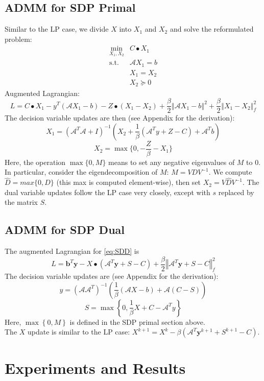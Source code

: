 \documentclass{article}
\begin{document}
\subsection*{ADMM for SDP Primal}
Similar to the LP case, we divide $X$ into $X_{1}$ and $X_{2}$
and solve the reformulated problem:
\begin{eqnarray*}
\min_{X_{1},X_{2}} & C\bullet X_{1}\\
\text{s.t.} & \mathcal{A}X_{1}=b\\
 & X_{1}=X_{2}\\
 & X_{2}\succeq0
\end{eqnarray*}
Augmented Lagrangian:
\[
L=C\bullet X_{1}-y^{T}\left(\mathcal{A}X_{1}-b\right)-Z\bullet\left(X_{1}-X_{2}\right)+\frac{\beta}{2}\left\Vert \mathcal{A}X_{1}-b\right\Vert ^{2}+\frac{\beta}{2}\left\Vert X_{1}-X_{2}\right\Vert _{f}^{2}
\]
The decision variable updates are then (see Appendix for the derivation):
\[
X_{1}=\left(\mathcal{A}^{T}\mathcal{A}+I\right)^{-1}\left(X_{2}+\frac{1}{\beta}\left(\mathcal{A}^{T}y+Z-C\right)+\mathcal{A}^{T}b\right)
\]
\[
X_{2} = \max\{0,-\frac{Z}{\beta}-X_{1}\}
\]
Here, the operation $\max\{0,M\}$ means to set any negative eigenvalues
of $M$ to 0. In particular, consider the eigendecomposition of $M$:
$M=VDV^{-1}$. We compute $\hat{D}=max\{0,D\}$ (this max is computed
element-wise), then set $X_{2}=V\hat{D}V^{-1}$. The dual variable updates follow the LP case very closely, except with $s$ replaced by the matrix $S$. 

\subsection*{ADMM for SDP Dual}
The augmented Lagrangian for \eqref{eq:SDD} is
\[
L=\mathbf{b}^{T}\mathbf{y}-X\bullet\left(\mathcal{A}^{T}\mathbf{y}+S-C\right)+\frac{\beta}{2}\left\Vert \mathcal{A}^{T}\mathbf{y}+S-C\right\Vert _{f}^{2}
\]
The decision variable updates are (see Appendix for the derivation):
\[
y=\left(\mathcal{A}\mathcal{A}^{T}\right)^{-1}\left(\frac{1}{\beta}\left(\mathcal{A}X-b\right)+\mathcal{A}\left(C-S\right)\right)
\]
\[
S=\max\left\{ 0,\frac{1}{\beta}X+C-\mathcal{A}^{T}y\right\} 
\]
Here, $\max\left\{ 0,M\right\} $ is defined in the SDP primal section above. \\
The $X$ update is similar to the LP case: $X^{k+1}=X^{k}-\beta\left(\mathcal{A}^{T}\mathbf{y}^{k+1}+S^{k+1}-C\right)$.

\section{Experiments and Results}
\end{document}
